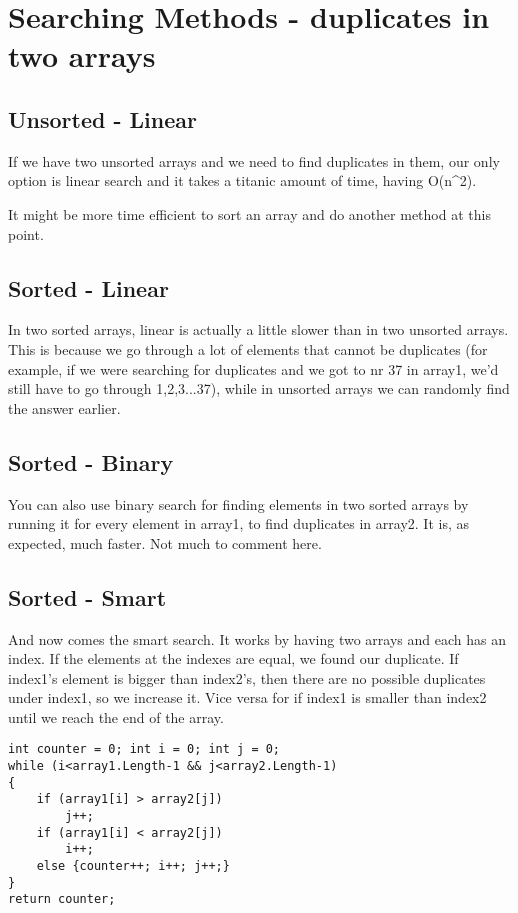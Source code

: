 \documentclass[a4paper,11pt]{article}
\begin{document}
\section*{Searching Methods - duplicates in two arrays}
\subsection*{Unsorted - Linear}
If we have two unsorted arrays and we need to find duplicates in them, our only option is linear search and it takes a titanic amount of time, having O(n^2).

 It might be more time efficient to sort an array and do another method at this point.

\subsection*{Sorted - Linear}
In two sorted arrays, linear is actually a little slower than in two unsorted arrays. This is because we go through a lot of elements that cannot be duplicates (for example, if we were searching for duplicates and we got to nr 37 in array1, we'd still have to go through 1,2,3...37), while in unsorted arrays we can randomly find the answer earlier.


\subsection*{Sorted - Binary}
You can also use binary search for finding elements in two sorted arrays by running it for every element in array1, to find duplicates in array2. It is, as expected, much faster. Not much to comment here.

\subsection*{Sorted - Smart}
And now comes the smart search. It works by having two arrays and each has an index. If the elements at the indexes are equal, we found our duplicate. If index1's element is bigger than index2's, then there are no possible duplicates under index1, so we increase it. Vice versa for if index1 is smaller than index2 until we reach the end of the array.
\begin{verbatim}
int counter = 0; int i = 0; int j = 0;
while (i<array1.Length-1 && j<array2.Length-1)
{
    if (array1[i] > array2[j])
        j++;
    if (array1[i] < array2[j])
        i++;
    else {counter++; i++; j++;}
}
return counter;
\end{verbatim}
\end{document}
